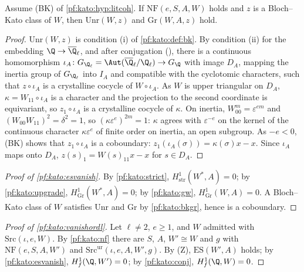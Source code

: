 \begin{theorem}\label{pf:kato:bkgr}
Assume (BK) of \cref{pf:kato:hyp:litcoh}. If $\mathrm{NF}(e,S,A,W)$ holds and $z$ is a Bloch--Kato class of $W$, then $\mathrm{Unr}(W,z)$ and
$\mathrm{Gr}(W,A,z)$ hold.
\end{theorem}

\begin{proof}
$\mathrm{Unr}(W,z)$ is condition (i) of \cref{pf:kato:def:bk}. By condition (ii) for the embedding $\Q\to\katoQlb$, and after conjugation
(), there is a continuous homomorphism $\iota_A\colon
G_{\Q_\ell}=\Aut(\katoQlb/\Q_\ell)\to G_\Q$ with image $D_A$, mapping the inertia group of $G_{\Q_\ell}$ into $I_A$ and compatible with the cyclotomic
characters, such that $z\circ\iota_A$ is a crystalline cocycle of $W\circ\iota_A$. As $W$ is upper triangular on $D_A$, $\kappa=W_{11}\circ\iota_A$ is a
character and the projection to the second coordinate is equivariant, so $z_1\circ\iota_A$ is a crystalline cocycle of $\kappa$. On inertia,
$W_{00}^m=\varepsilon^{em}$ and $(W_{00}W_{11})^2=\delta^2=1$, so $(\kappa\varepsilon^e)^{2m}=1$: $\kappa$ agrees with $\varepsilon^{-e}$ on the kernel of the
continuous character $\kappa\varepsilon^e$ of finite order on inertia, an open subgroup. As $-e<0$, (BK) shows that $z_1\circ\iota_A$ is a
coboundary: $z_1(\iota_A(\sigma))=\kappa(\sigma)x-x$. Since $\iota_A$ maps onto $D_A$, $z(s)_1=W(s)_{11}x-x$ for $s\in D_A$.
\end{proof}

\begin{proof}[Proof of \cref{pf:kato:esvanish}]
By \cref{pf:kato:strict}, $H^1_{\mathrm{str}}(W^*,A)=0$; by \cref{pf:kato:upgrade}, $H^1_{\mathrm{Gr}}(W^*,A)=0$; by \cref{pf:kato:gw},
$H^1_{\mathrm{Gr}}(W,A)=0$. A Bloch--Kato class of $W$ satisfies $\mathrm{Unr}$ and $\mathrm{Gr}$ by \cref{pf:kato:bkgr}, hence is a coboundary.
\end{proof}

\begin{proof}[Proof of \cref{pf:kato:vanishordl}]
Let $\ell\ne2$, $e\ge1$, and $W$ admitted with $\mathrm{Src}(\iota,e,W)$. By \cref{pf:kato:nf} there are $S$, $A$, $W'\cong W$ and $g$ with
$\mathrm{NF}(e,S,A,W')$ and $\mathrm{Src}^{\mathrm{ur}}(\iota,e,A,W',g)$. By \textup{(Z)}, $\mathrm{ES}(W',A)$ holds; by \cref{pf:kato:esvanish},
$\katoHf(\Q,W')=0$; by \cref{pf:kato:conj}, $\katoHf(\Q,W)=0$.
\end{proof}

